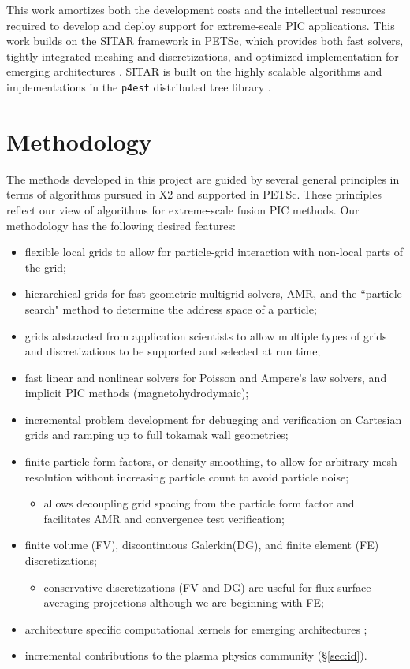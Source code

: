 \documentclass[review]{siamart}
\begin{document}
This work amortizes both the development costs and the intellectual resources required to develop and deploy support for extreme-scale PIC applications.
This work builds on the SITAR framework in PETSc, which provides both fast solvers, tightly integrated meshing and discretizations, and optimized implementation for emerging architectures \cite{KnepleyBrownMcInnesSmithRuppAdams2015}.
SITAR is built on the highly scalable algorithms and implementations in the {\tt p4est} distributed tree library \cite{DBLP:journals/siamsc/IsaacBWG15,Rudi:2015:EIS:2807591.2807675,Stadler1033}.

\section{Methodology}

The methods developed in this project are guided by several general principles in terms of algorithms pursued in X2 and supported in PETSc.
These principles reflect our view of algorithms for extreme-scale fusion PIC methods.
Our methodology has the following desired features:
\begin{itemize}
\item flexible local grids to allow for particle-grid interaction with non-local parts of the grid;
\item hierarchical grids for fast geometric multigrid solvers, AMR, and the ``particle search" method to determine the address space of a particle;
\item grids abstracted from application scientists to allow multiple types of grids and discretizations to be supported and selected at run time;
\item fast linear and nonlinear solvers for Poisson and Ampere's law solvers, and implicit PIC methods (magnetohydrodymaic);
\item incremental problem development for debugging and verification on Cartesian grids and ramping up to full tokamak wall geometries;
\item finite particle form factors, or density smoothing, to allow for arbitrary mesh resolution without increasing particle count to avoid particle noise;
\begin{itemize}
\item allows decoupling grid spacing from the particle form factor and facilitates AMR and convergence test verification;
\end{itemize}
\item finite volume (FV), discontinuous Galerkin(DG), and finite element (FE) discretizations;
\begin{itemize}
\item conservative discretizations (FV and DG) are useful for flux surface averaging projections although we are beginning with FE;
\end{itemize}
\item architecture specific computational kernels for emerging architectures \cite{KnepleyBrownMcInnesSmithRuppAdams2015};
\item incremental contributions to the plasma physics community (\S\ref{sec:id}).
\end{itemize}
\end{document}
